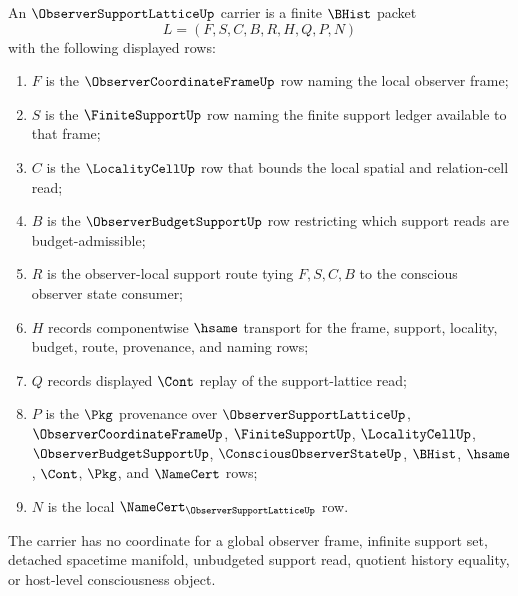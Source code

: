 \begin{definition}
\label{def:observer-support-lattice-carrier}
An $\ObserverSupportLatticeUp$ carrier is a finite $\BHist$ packet
$$
L=(F,S,C,B,R,H,Q,P,N)
$$
with the following displayed rows:
\begin{enumerate}
\item $F$ is the $\ObserverCoordinateFrameUp$ row naming the local observer frame;
\item $S$ is the $\FiniteSupportUp$ row naming the finite support ledger available to that frame;
\item $C$ is the $\LocalityCellUp$ row that bounds the local spatial and relation-cell read;
\item $B$ is the $\ObserverBudgetSupportUp$ row restricting which support reads are budget-admissible;
\item $R$ is the observer-local support route tying $F,S,C,B$ to the conscious observer state consumer;
\item $H$ records componentwise $\hsame$ transport for the frame, support, locality, budget, route, provenance, and naming rows;
\item $Q$ records displayed $\Cont$ replay of the support-lattice read;
\item $P$ is the $\Pkg$ provenance over $\ObserverSupportLatticeUp$, $\ObserverCoordinateFrameUp$, $\FiniteSupportUp$, $\LocalityCellUp$, $\ObserverBudgetSupportUp$, $\ConsciousObserverStateUp$, $\BHist$, $\hsame$, $\Cont$, $\Pkg$, and $\NameCert$ rows;
\item $N$ is the local $\NameCert_{\ObserverSupportLatticeUp}$ row.
\end{enumerate}
The carrier has no coordinate for a global observer frame, infinite support set, detached spacetime manifold, unbudgeted support read, quotient history equality, or host-level consciousness object.
\end{definition}

